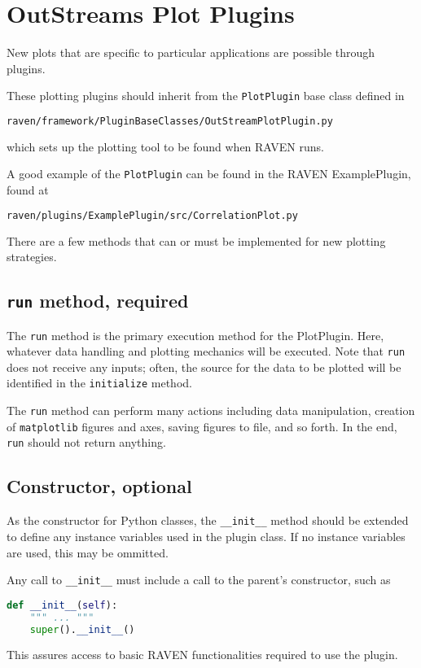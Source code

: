 \section{OutStreams Plot Plugins}
\label{sec:outstreams_plot}
New plots that are specific to particular applications are possible through 
 plugins.

These plotting plugins should inherit from the \texttt{PlotPlugin} base class defined in
\begin{lstlisting}[language=bash]
  raven/framework/PluginBaseClasses/OutStreamPlotPlugin.py
\end{lstlisting}
which sets up the plotting tool to be found when RAVEN runs.

A good example of the \texttt{PlotPlugin} can be found in the RAVEN ExamplePlugin, found at
\begin{lstlisting}[language=bash]
  raven/plugins/ExamplePlugin/src/CorrelationPlot.py
\end{lstlisting}

There are a few methods that can or must be implemented for new plotting strategies.

%
%
\subsection{\texttt{run} method, required}
The \texttt{run} method is the primary execution method for the PlotPlugin. Here, whatever data
handling and plotting mechanics will be executed. Note that \texttt{run} does not receive any inputs;
often, the source for the data to be plotted will be identified in the \texttt{initialize} method.

The \texttt{run} method can perform many actions including data manipulation, creation of
\texttt{matplotlib} figures and axes, saving figures to file, and so forth. In the end, \texttt{run}
should not return anything.

%
%
\subsection{Constructor, optional}
As the constructor for Python classes, the \texttt{\_\_init\_\_} method should be extended to define
any instance variables used in the plugin class. If no instance variables are used, this may be ommitted.

Any call to \texttt{\_\_init\_\_} must include a call to the parent's constructor, such as
\begin{lstlisting}[language=python]
  def __init__(self):
    """ ... """
    super().__init__()
\end{lstlisting}
This assures access to basic RAVEN functionalities required to use the plugin.

